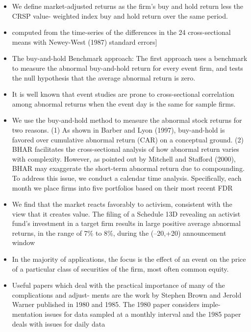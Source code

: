 \documentclass[12pt]{article}
\begin{document}
\begin{itemize}
        \item We define market-adjusted returns as the firm’s buy and hold return less the CRSP value-
        weighted index buy and hold return over the same period. \citet{Choi2012}
        \item computed from the time-series of the differences in the 24 cross-sectional means with Newey-West (1987) standard errors] \citet{Choi2012}
        \item The buy-and-hold Benchmark approach: The first approach uses a benchmark to measure the abnormal buy-and-hold return for every event firm, and tests the null hypothesis that the average abnormal return is zero.\citet{ang2011}
        \item It is well known that event studies are prone to cross-sectional correlation among abnormal returns when the event day is the same for sample firms. \citet{Kolari2010}
        \item We use the buy-and-hold method to measure the abnormal stock returns for two
        reasons. (1) As shown in Barber and Lyon (1997), buy-and-hold is favored over cumulative abnormal return (CAR) on a conceptual ground. (2) BHAR facilitates the cross-sectional analysis of how abnormal return varies with complexity. However, as pointed out by Mitchell and Stafford (2000), BHAR may exaggerate the short-term abnormal return due to compounding. To address this issue, we conduct a calendar time analysis. Specifically, each month we place firms into five portfolios based on their most recent FDR \citet{You2009}
        \item We find that the market reacts favorably to activism, consistent with the view that it creates value. The filing of a Schedule 13D revealing an activist fund’s investment in a target firm results in large positive average abnormal returns, in the range
        of 7\% to 8\%, during the (–20,+20) announcement window \citet{Brav2008}
        \item In the majority of applications, the focus is the effect of an event on the price of a particular class of securities of the firm, most often common equity. \citet{MacKinlay1997}
        \item Useful papers which deal with the practical importance of many of the complications and adjust- ments are the work by Stephen Brown and Jerold Warner published in 1980 and 1985. The 1980 paper considers imple- mentation issues for data sampled at a monthly interval and the 1985 paper deals with issues for daily data \citet{MacKinlay1997}

\end{itemize}
\end{document}
